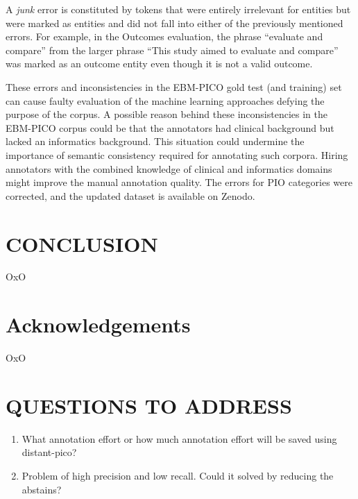 \documentclass[10.7pt,]{article}
\begin{document}
A \textit{junk} error is constituted by tokens that were entirely irrelevant for entities but were marked as entities and did not fall into either of the previously mentioned errors.
For example, in the Outcomes evaluation, the phrase ``evaluate and compare'' from the larger phrase ``This study aimed to evaluate and compare'' was marked as an outcome entity even though it is not a valid outcome.


These errors and inconsistencies in the EBM-PICO gold test (and training) set can cause faulty evaluation of the machine learning approaches defying the purpose of the corpus.
A possible reason behind these inconsistencies in the EBM-PICO corpus could be that the annotators had clinical background but lacked an informatics background.
This situation could undermine the importance of semantic consistency required for annotating such corpora.
Hiring annotators with the combined knowledge of clinical and informatics domains might improve the manual annotation quality.
The errors for PIO categories were corrected, and the updated dataset is available on Zenodo.
%
%
%
\section{CONCLUSION}\label{conclusion}
%
OxO
%
%
%
\section{Acknowledgements}\label{acknowledgements}
%
OxO
%
%
%
\section{QUESTIONS TO ADDRESS}\label{ques}
%
\begin{enumerate}
    \item What annotation effort or how much annotation effort will be saved using distant-pico?
    \item Problem of high precision and low recall. Could it solved by reducing the abstains?
\end{enumerate}
%
%
%


\end{document}
